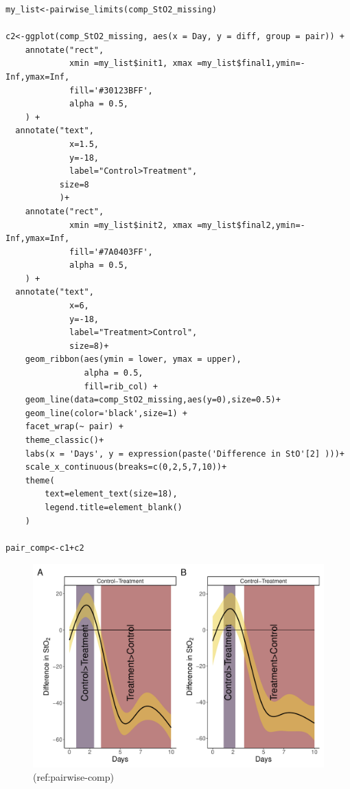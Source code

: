 \documentclass[Royal,times,sagev]{sagej}
\begin{document}
\begin{verbatim}
my_list<-pairwise_limits(comp_StO2_missing)

c2<-ggplot(comp_StO2_missing, aes(x = Day, y = diff, group = pair)) +
    annotate("rect",
             xmin =my_list$init1, xmax =my_list$final1,ymin=-Inf,ymax=Inf,
             fill='#30123BFF',
             alpha = 0.5,
    ) +
  annotate("text",
             x=1.5,
             y=-18,
             label="Control>Treatment",
           size=8
           )+
    annotate("rect",
             xmin =my_list$init2, xmax =my_list$final2,ymin=-Inf,ymax=Inf,
             fill='#7A0403FF',
             alpha = 0.5,
    ) +
  annotate("text",
             x=6,
             y=-18,
             label="Treatment>Control",
             size=8)+
    geom_ribbon(aes(ymin = lower, ymax = upper),
                alpha = 0.5,
                fill=rib_col) +
    geom_line(data=comp_StO2_missing,aes(y=0),size=0.5)+
    geom_line(color='black',size=1) +
    facet_wrap(~ pair) +
    theme_classic()+
    labs(x = 'Days', y = expression(paste('Difference in StO'[2] )))+
    scale_x_continuous(breaks=c(0,2,5,7,10))+
    theme(
        text=element_text(size=18),
        legend.title=element_blank()
    )

pair_comp<-c1+c2
\end{verbatim}

\begin{figure}

{\centering \includegraphics[width=0.75\linewidth]{Full_document_SAGE_files/figure-latex/plot-pairwise-comp-Appendix-1} 

}

\caption{(ref:pairwise-comp)}\label{fig:plot-pairwise-comp-Appendix}
\end{figure}



\end{document}

